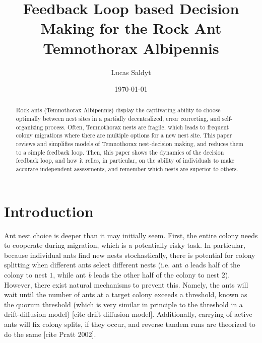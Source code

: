 \documentclass{article}
\title{Feedback Loop based Decision Making for the Rock Ant Temnothorax Albipennis}
\date{\today}
\author{Lucas Saldyt}
\begin{document}
\maketitle

\begin{abstract}
    Rock ants (Temnothorax Albipennis) display the captivating ability to choose optimally between nest sites in a partially decentralized, error correcting, and self-organizing process.
    Often, Temnothorax nests are fragile, which leads to frequent colony migrations where there are multiple options for a new nest site.
    This paper reviews and simplifies models of Temnothorax nest-decision making, and reduces them to a simple feedback loop.
    Then, this paper shows the dynamics of the decision feedback loop, and how it relies, in particular, on the ability of individuals to make accurate independent assessments, and remember which nests are superior to others.
\end{abstract}

\section{Introduction}


Ant nest choice is deeper than it may initially seem.
First, the entire colony needs to cooperate during migration, which is a potentially risky task.
In particular, because individual ants find new nests stochastically, there is potential for colony splitting when different ants select different nests (i.e. ant \emph{a} leads half of the colony to nest $1$, while ant \emph{b} leads the other half of the colony to nest $2$).
However, there exist natural mechanisms to prevent this.
Namely, the ants will wait until the number of ants at a target colony exceeds a threshold, known as the quorum threshold (which is very similar in principle to the threshold in a drift-diffusion model) [cite drift diffusion model].
Additionally, carrying of active ants will fix colony splits, if they occur, and reverse tandem runs are theorized to do the same [cite Pratt 2002]. 
\end{document}
